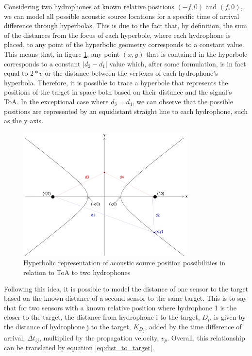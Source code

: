 Considering two hydrophones at known relative positions $(-f,0)$ and $(f,0)$, we can model all possible acoustic source locations for a specific time of arrival difference through hyperbolas. This is due to the fact that, by definition, the sum of the distances from the focus of each hyperbole, where each hydrophone is placed, to any point of the hyperbolic geometry corresponds to a constant value. 
This means that, in figure \ref{fig:hyper}, any point $(x,y)$ that is contained in the hyperbole corresponds to a constant $|d_2-d_1|$ value which, after some formulation, is in fact equal to $2*v$ or the distance between the vertexes of each hydrophone's hyperbola. Therefore, it is possible to trace a hyperbole that represents the positions of the target in space both based on their distance and the signal's ToA. In the exceptional case where $d_3=d_4$, we can observe that the possible positions are represented by an equidistant straight line to each hydrophone, such as the y axis.

\begin{figure}[!htbp]
	\centering
	\includegraphics[width=0.8\textwidth]{figures/hyperbole-dist}
	\captionsetup{justification=centering,margin=2cm}
	\caption{Hyperbolic representation of acoustic source position possibilities in relation to ToA to two hydrophones}
	\label{fig:hyper}
\end{figure}

Following this idea, it is possible to model the distance of one sensor to the target based on the known distance of a second sensor to the same target. This is to say that for two sensors with a known relative position where hydrophone 1 is the closer to the target, the distance from hydrophone i to the target, $D_i$, is given by the distance of hydrophone j to the target, $K_{D_j}$, added by the time difference of arrival, $\Delta t_{ij}$, multiplied by the propagation velocity, $v_p$. Overall, this relationship can be translated by equation \ref{eq:dist_to_target}.

